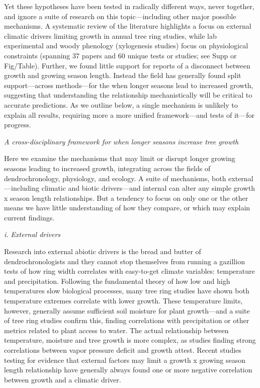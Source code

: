 \documentclass[11pt]{article}
\begin{document}
Yet these hypotheses have been tested in radically different ways, never together, and ignore a suite of research on this topic---including other major possible mechanisms. A systematic review of the literature highlights a focus on external climatic drivers limiting growth in annual tree ring studies, while lab experimental and woody phenology (xylogenesis studies) focus on physiological constraints (spanning 37 papers and 60 unique tests or studies; see Supp or Fig/Table). Further, we found little support for reports of a disconnect between growth and growing season length. Instead the field has generally found split support---across methods---for the when longer seasons lead to increased growth, suggesting that understanding the relationship mechanistically will be critical to accurate predictions. As we outline below, a single mechanism is unlikely to explain all results, requiring more a more unified framework---and tests of it---for progress. 

\emph{A cross-disciplinary framework for when longer seasons increase tree growth}

Here we examine the mechanisms that may limit or disrupt longer growing seasons leading to increased growth, integrating across the fields of dendrochronology, physiology, and ecology. A suite of mechanisms, both external---including climatic and biotic drivers---and internal can alter any simple growth x season length relationships. But a tendency to focus on only one or the other means we have little understanding of how they compare, or which may explain current findings. 

\emph{i. External drivers}

Research into external abiotic drivers is the bread and butter of dendrochronologists and they cannot stop themselves from running a gazillion tests of how ring width correlates with easy-to-get climate variables: temperature and precipitation. Following the fundamental theory of how low and high temperatures slow biological processes, many tree ring studies have shown both temperature extremes correlate with lower growth. These temperature limits, however, generally assume sufficient soil moisture for plant growth---and a suite of tree ring studies confirm this, finding correlations with precipitation or other metrics related to plant access to water. The actual relationship between temperature, moisture and tree growth is more complex, as studies finding strong correlations between vapor pressure deficit and growth attest. Recent studies testing for evidence that external factors may limit a growth x growing season length relationship have generally always found one or more negative correlation between growth and a climatic driver. 
\end{document}

